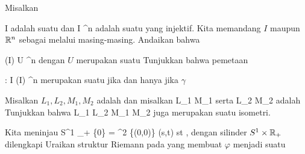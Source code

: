 {}
{

Misalkan

\mavergleichskette
{\vergleichskette
{ I
}
{ \subseteq }{ \R
}
{  }{
}
{    }{
}
{   }{
}
}
{}{}{}
adalah suatu
dan
\maabbdisp {\gamma} { I } { \R^n
} {}
adalah suatu
yang injektif. Kita memandang $I$ maupun ${\mathbb R}^n$ sebagai
melalui
masing-masing. Andaikan bahwa

\mavergleichskette
{\vergleichskette
{ \gamma(I)
}
{ \subseteq }{ U
}
{ \subseteq }{ \R^n
}
{    }{
}
{   }{
}
}
{}{}{}
dengan $U$
merupakan suatu
Tunjukkan bahwa pemetaan

\mavergleichskettedisp
{\vergleichskette
{ \gamma
}
{ :} { I
}
{ \longrightarrow} { \gamma(I) \subseteq \R^n
}
{ } {
}
{ } {
}
}
{}{}{}
merupakan suatu
jika dan hanya jika $\gamma$

}
{} {}

{}
{

Misalkan $L_1,L_2,M_1,M_2$ adalah
dan misalkan
 {L_1 } { M_1
} {}
serta
 {L_2 } { M_2
} {}
adalah
Tunjukkan bahwa
 {L_1 \times L_2 } { M_1 \times M_2
} {}
juga merupakan suatu isometri.

}
{} {}

{}
{

Kita meninjau
\maabbeledisp {\varphi} {S^1 \times \R_+} { \Complex \setminus \{0\}  =  \R^2 \setminus \{(0,0)\}
} {(s,t) } { st
} {,}
dengan silinder $S^1 \times {\mathbb R}_+$ dilengkapi
Uraikan struktur Riemann pada
yang membuat $\varphi$ menjadi suatu

}
{} {}

